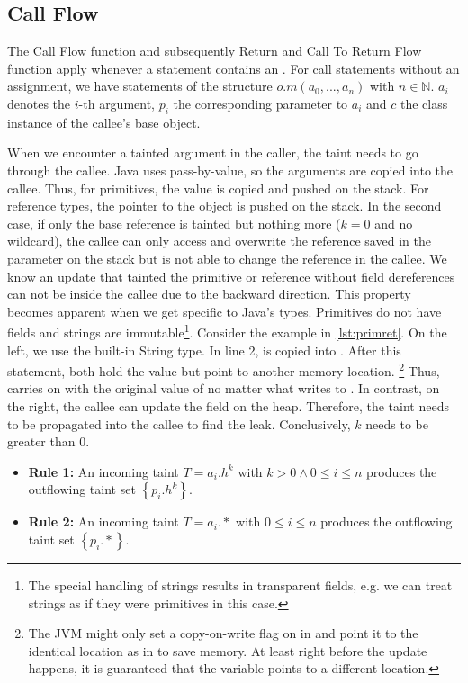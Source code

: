 \documentclass[../draft.tex]{subfiles}
\begin{document}
    \subsection{Call Flow}
    The Call Flow function and subsequently Return and Call To Return Flow function apply whenever a statement contains an .
    For call statements without an assignment, we have statements of the structure $o.m(a_0, ..., a_n)$ with $n \in \mathbb{N}$. $a_i$ denotes the $i$-th argument, $p_i$ the corresponding parameter to $a_i$ and $c$ the class instance of the callee's base object.

    When we encounter a tainted argument in the caller, the taint needs to go through the callee.
    Java uses pass-by-value, so the arguments are copied into the callee.
    Thus, for primitives, the value is copied and pushed on the stack.
    For reference types, the pointer to the object is pushed on the stack.
    In the second case, if only the base reference is tainted but nothing more ($k=0$ and no wildcard), the callee can only access and overwrite the reference saved in the parameter on the stack but is not able to change the reference in the callee.
    We know an update that tainted the primitive or reference without field dereferences can not be inside the callee due to the backward direction.
    This property becomes apparent when we get specific to Java's types.
    Primitives do not have fields and strings are immutable\footnote{The special handling of strings results in transparent fields, e.g. we can treat strings as if they were primitives in this case.}.
    Consider the example in \autoref{lst:primret}.
    On the left, we use the built-in String type.
    In line 2,  is copied into .
    After this statement, both  hold the value  but point to another memory location\footnotemark{}.
    \footnote{%
        The JVM might only set a copy-on-write flag on  in  and point it to the identical location as  in  to save memory.
        At least right before the update happens, it is guaranteed that the variable points to a different location.
    }
    Thus,  carries on with the original value of  no matter what  writes to .
    In contrast, on the right, the callee can update the field on the heap.
    Therefore, the taint needs to be propagated into the callee to find the leak.
    Conclusively, $k$ needs to be greater than $0$.
    \begin{itemize}
        \item[] \textbf{Rule 1:} An incoming taint $T=a_i.h^k$ with $k > 0 \land 0 \leq i \leq n$ produces the outflowing taint set $\left\{p_i.h^k\right\}$.
        \item[] \textbf{Rule 2:} An incoming taint $T=a_i.*$ with $0 \leq i \leq n$ produces the outflowing taint set $\left\{p_i.*\right\}$.
    \end{itemize}
\end{document}
